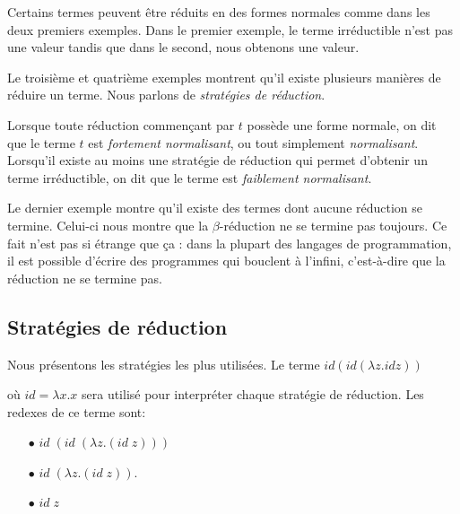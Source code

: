 Certains termes peuvent être réduits en des formes normales comme
dans les deux premiers exemples. Dans le premier exemple, le terme
irréductible n'est pas une valeur tandis que dans le second, nous obtenons
une valeur.

Le troisième et quatrième exemples montrent qu'il existe plusieurs manières de
réduire un terme. Nous parlons de \textit{stratégies de réduction}.

Lorsque toute réduction commençant par $t$ possède une forme normale, on dit que
le terme $t$ est \textit{fortement normalisant}, ou tout simplement
\textit{normalisant}. Lorsqu'il existe au moins une stratégie de réduction qui
permet d'obtenir un terme irréductible, on dit que le terme est \textit{faiblement normalisant}.

Le dernier exemple montre qu'il existe des termes dont aucune réduction se
termine. Celui-ci nous montre que la $\beta$-réduction ne se termine pas toujours.
Ce fait n'est pas si étrange que ça : dans la plupart des langages de
programmation, il est possible d'écrire des programmes qui bouclent à l'infini,
c'est-à-dire que la réduction ne se termine pas.



\subsection{Stratégies de réduction}

Nous présentons les stratégies les plus utilisées. Le terme
\begin{math}
  id (id (\lambda z . id z))
\end{math}

où $id = \lambda x . x$ sera utilisé pour interpréter chaque stratégie de réduction.
Les redexes de ce terme sont:
\begin{itemize}
\item[$\bullet$] $id \; (id \; (\lambda z . (id \; z)))$
\item[$\bullet$] $id \; (\lambda z . (id \; z))$.
\item[$\bullet$] $id \; z$
\end{itemize}

